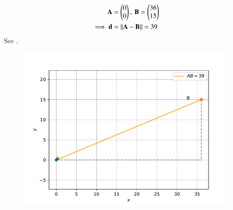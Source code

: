 \begin{align}
\vec{A}&=\myvec{0 \\ 0},\  
\Vec{B}=\myvec{36 \\ 15} \\ 
\implies 
\vec{d}&=\norm{\vec{A}-\vec{B}}
=39
\end{align}
See 
.
\begin{figure}[H]
\centering
\includegraphics[width=0.75\columnwidth]{chapters/10/7/1/2/figs/vec.pdf}
\caption{}
\label{fig:10/7/1/2vec}
\end{figure}
